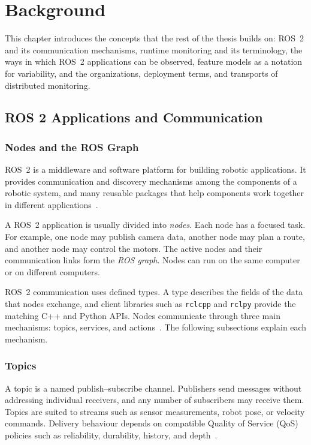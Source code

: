 \chapter{Background}\label{chapter:background}

This chapter introduces the concepts that the rest of the thesis builds on:
ROS~2 and its communication mechanisms, runtime monitoring and its
terminology, the ways in which ROS~2 applications can be observed, feature
models as a notation for variability, and the organizations, deployment
terms, and transports of distributed monitoring.

\section{ROS 2 Applications and Communication}\label{sec:ros2-communication}

\subsection{Nodes and the ROS Graph}

ROS~2 is a middleware and software platform for building robotic applications.
It provides communication and discovery mechanisms among the components of a
robotic system, and many reusable packages that help components work together
in different applications~\cite{macenski2022ros2}.

A ROS~2 application is usually divided into \emph{nodes}. Each node has a
focused task. For example, one node may publish camera data, another node may
plan a route, and another node may control the motors. The active nodes and
their communication links form the \emph{ROS graph}. Nodes can run on the same
computer or on different computers.

ROS~2 communication uses defined types. A type describes the fields of the
data that nodes exchange, and client libraries such as \texttt{rclcpp} and
\texttt{rclpy} provide the matching C++ and Python APIs. Nodes communicate
through three main mechanisms: topics, services, and
actions~\cite{ros2interfaces,macenski2022ros2}. The following subsections
explain each mechanism.

\subsection{Topics}

A topic is a named publish--subscribe channel. Publishers send messages without
addressing individual receivers, and any number of subscribers may receive
them. Topics are suited to streams such as sensor measurements, robot pose, or
velocity commands. Delivery behaviour depends on compatible Quality of Service
(QoS) policies such as reliability, durability, history, and
depth~\cite{ros2topics,ros2qos}.

